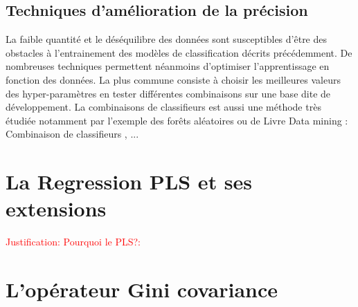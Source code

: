 \subsection{Techniques d'amélioration de la précision}
La faible quantité \citep{ruparel2013smalldataclass} et le déséquilibre des données sont susceptibles d'être des obstacles à l'entrainement des modèles de classification décrits précédemment. De nombreuses techniques permettent néanmoins d'optimiser l'apprentissage en fonction des données. La plus commune consiste à choisir les meilleures valeurs des hyper-paramètres en tester différentes combinaisons sur une base dite de développement. La combinaisons de classifieurs est aussi une méthode très étudiée \citep{kittler1996combiningclassifiers,kuncheva2004combiningclassifiers, tulyakov2008combiningclassifiers} notamment par l'exemple des forêts aléatoires \citep{breiman2001randomforest} ou de
Livre Data mining : Combinaison de classifieurs \citep{kittler1996combiningclassifiers,kuncheva2004combiningclassifiers, tulyakov2008combiningclassifiers} , ...

\section{La Regression PLS et ses extensions}
\label{sec:sensresultat:pls}
\textcolor{red}{Justification: Pourquoi le PLS?:}

\section{L'opérateur Gini covariance}

